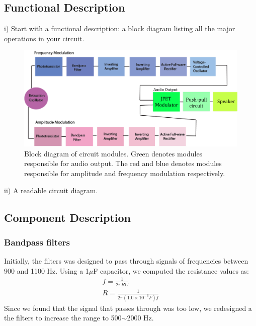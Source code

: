 \documentclass[twocolumn]{article}
\begin{document}
\subsection{Functional Description}
i)                Start with a functional description: a block diagram listing all the major operations in your circuit.
\begin{figure}
 \centering
\includegraphics[width=450pt]{figure/block}
\caption{Block diagram of circuit modules. Green denotes modules responsible for audio output. The red and blue denotes modules responsible for amplitude and frequency modulation respectively.}
\label{block}
\end{figure}
ii)              A readable circuit diagram.
\subsection{Component Description}
\subsubsection{Bandpass filters}
Initially, the filters was designed to pass through signals of frequencies between 900 and 1100 Hz. Using a 1$\mu$F capacitor, we computed the resistance values as: 
\begin{align*}
f = \frac{1}{2\pi RC}
\\ R = \frac{1}{2\pi (1.0\times10^{-6} F)f}
\end{align*}
Since we found that the signal that passes through was too low, we redesigned a the filters to increase the range to 500$\sim$2000 Hz.
\end{document}
